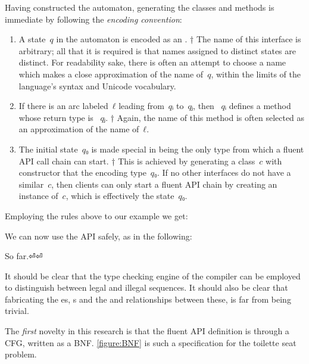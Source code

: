 Having constructed the automaton, generating the classes and methods is immediate
by following the \emph{encoding convention}:
\begin{enumerate}
  \item A state~$q$ in the automaton is encoded as an .%
        †{%
          The name of this interface is arbitrary; all that it is required is that
          names assigned to distinct states are distinct.
          For readability sake, there is often an attempt to choose a name
          which makes a close approximation of the name of~$q$, within
          the limits of the language's syntax and Unicode vocabulary.
        }
  \item If there is an arc labeled~$ℓ$ leading from~$qᵢ$ to~$qⱼ$,
        then ~$qᵢ$ defines a
        method whose return type is ~$qⱼ$.%
        †{%
          Again, the name of this method is often selected as an approximation of the name of~$ℓ$.
        }
  \item The initial state~$q₀$ is made special in being the only type from
        which a fluent API call chain can start.%
        †{%
          This is achieved by generating a class~$c$ with 
          constructor that  the  encoding type~$q₀$.
          If no other interfaces do not have a similar~$c$, then clients can only
          start a fluent API chain by creating an instance of~$c$, which is
          effectively the state~$q₀$.
        }
\end{enumerate}

Employing the rules above to our example we get: 

We can now use the API safely, as in the following:

So far.⏎⏎

It should be clear that the type checking engine of the compiler can
be employed to distinguish between legal and illegal sequences.
It should also be clear that fabricating the es, s
and the  and  relationships between these, is
far from being trivial.

The \emph{first} novelty in this research is that the fluent API definition is
  through a CFG, written as a BNF.
\cref{figure:BNF} is such a specification for the toilette seat problem.

